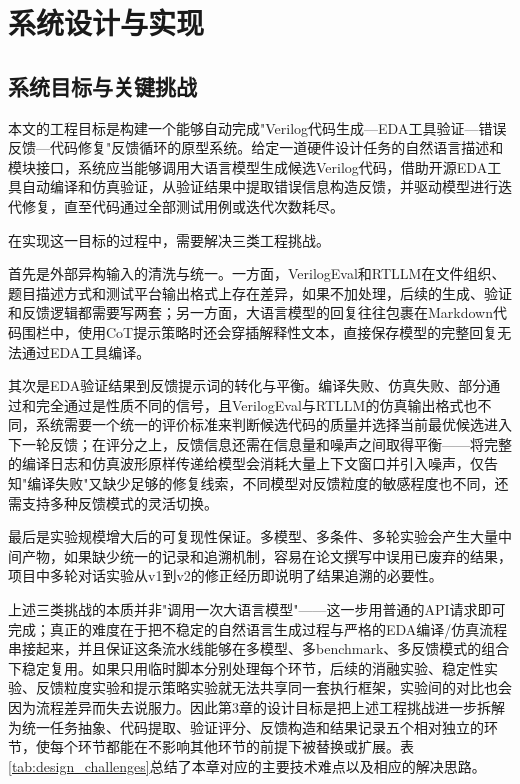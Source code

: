 \chapter{系统设计与实现}

\section{系统目标与关键挑战}

本文的工程目标是构建一个能够自动完成"Verilog代码生成—EDA工具验证—错误反馈—代码修复"反馈循环的原型系统。给定一道硬件设计任务的自然语言描述和模块接口，系统应当能够调用大语言模型生成候选Verilog代码，借助开源EDA工具自动编译和仿真验证，从验证结果中提取错误信息构造反馈，并驱动模型进行迭代修复，直至代码通过全部测试用例或迭代次数耗尽。

在实现这一目标的过程中，需要解决三类工程挑战。

首先是外部异构输入的清洗与统一。一方面，VerilogEval\cite{verilogeval}和RTLLM\cite{rtllm}在文件组织、题目描述方式和测试平台输出格式上存在差异，如果不加处理，后续的生成、验证和反馈逻辑都需要写两套；另一方面，大语言模型的回复往往包裹在Markdown代码围栏中，使用CoT提示策略时还会穿插解释性文本，直接保存模型的完整回复无法通过EDA工具编译。

其次是EDA验证结果到反馈提示词的转化与平衡。编译失败、仿真失败、部分通过和完全通过是性质不同的信号，且VerilogEval与RTLLM的仿真输出格式也不同，系统需要一个统一的评价标准来判断候选代码的质量并选择当前最优候选进入下一轮反馈；在评分之上，反馈信息还需在信息量和噪声之间取得平衡——将完整的编译日志和仿真波形原样传递给模型会消耗大量上下文窗口并引入噪声，仅告知"编译失败"又缺少足够的修复线索，不同模型对反馈粒度的敏感程度也不同，还需支持多种反馈模式的灵活切换。

最后是实验规模增大后的可复现性保证。多模型、多条件、多轮实验会产生大量中间产物，如果缺少统一的记录和追溯机制，容易在论文撰写中误用已废弃的结果，项目中多轮对话实验从v1到v2的修正经历即说明了结果追溯的必要性。

上述三类挑战的本质并非"调用一次大语言模型"——这一步用普通的API请求即可完成；真正的难度在于把不稳定的自然语言生成过程与严格的EDA编译/仿真流程串接起来，并且保证这条流水线能够在多模型、多benchmark、多反馈模式的组合下稳定复用。如果只用临时脚本分别处理每个环节，后续的消融实验、稳定性实验、反馈粒度实验和提示策略实验就无法共享同一套执行框架，实验间的对比也会因为流程差异而失去说服力。因此第3章的设计目标是把上述工程挑战进一步拆解为统一任务抽象、代码提取、验证评分、反馈构造和结果记录五个相对独立的环节，使每个环节都能在不影响其他环节的前提下被替换或扩展。表\ref{tab:design_challenges}总结了本章对应的主要技术难点以及相应的解决思路。

